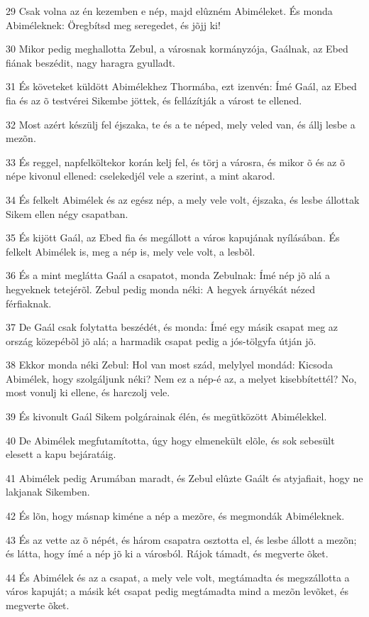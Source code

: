 \par 29 Csak volna az én kezemben e nép, majd elûzném Abiméleket. És monda Abiméleknek: Öregbítsd meg seregedet, és jõjj ki!
\par 30 Mikor pedig meghallotta Zebul, a városnak kormányzója, Gaálnak, az Ebed fiának beszédit, nagy haragra gyulladt.
\par 31 És követeket küldött Abimélekhez Thormába, ezt izenvén: Ímé Gaál, az Ebed fia és az õ testvérei Sikembe jöttek, és fellázítják a várost te ellened.
\par 32 Most azért készülj fel éjszaka, te és a te néped, mely veled van, és állj lesbe a mezõn.
\par 33 És reggel, napfelköltekor korán kelj fel, és törj a városra, és mikor õ és az õ népe kivonul ellened: cselekedjél vele a szerint, a mint akarod.
\par 34 És felkelt Abimélek és az egész nép, a mely vele volt, éjszaka, és lesbe állottak Sikem ellen négy csapatban.
\par 35 És kijött Gaál, az Ebed fia és megállott a város kapujának nyílásában. És felkelt Abimélek is, meg a nép is, mely vele volt, a lesbõl.
\par 36 És a mint meglátta Gaál a csapatot, monda Zebulnak: Ímé nép jõ alá a hegyeknek tetejérõl. Zebul pedig monda néki: A hegyek árnyékát nézed férfiaknak.
\par 37 De Gaál csak folytatta beszédét, és monda: Ímé egy másik csapat meg az ország közepébõl jõ alá; a harmadik csapat pedig a jós-tölgyfa útján jõ.
\par 38 Ekkor monda néki Zebul: Hol van most szád, melylyel mondád: Kicsoda Abimélek, hogy szolgáljunk néki? Nem ez a nép-é az, a melyet kisebbítettél? No, most vonulj ki ellene, és harczolj vele.
\par 39 És kivonult Gaál Sikem polgárainak élén, és megütközött Abimélekkel.
\par 40 De Abimélek megfutamította, úgy hogy elmenekült elõle, és sok sebesült elesett a kapu bejáratáig.
\par 41 Abimélek pedig Arumában maradt, és Zebul elûzte Gaált és atyjafiait, hogy ne lakjanak Sikemben.
\par 42 És lõn, hogy másnap kiméne a nép a mezõre, és megmondák Abiméleknek.
\par 43 És az vette az õ népét, és három csapatra osztotta el, és lesbe állott a mezõn; és látta, hogy ímé a nép jõ ki a városból. Rájok támadt, és megverte õket.
\par 44 És Abimélek és az a csapat, a mely vele volt, megtámadta és megszállotta a város kapuját; a másik két csapat pedig megtámadta mind a mezõn levõket, és megverte õket.
